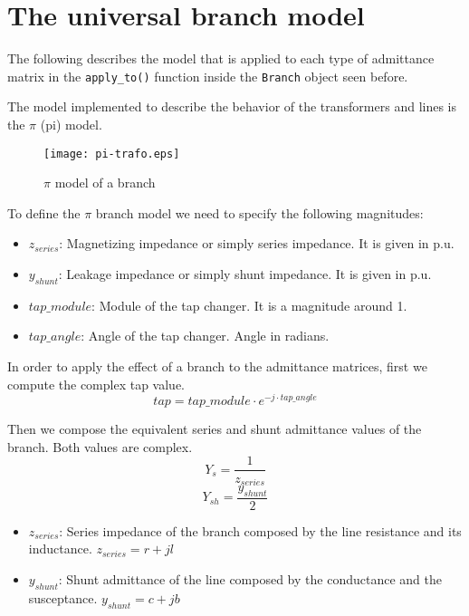 \documentclass[11pt,fleqn]{book} %
\begin{document}
\section{The universal branch model}\label{Universal_branch_model}

The following describes the model that is applied to each type of admittance matrix in the \verb|apply_to()| function inside the \verb|Branch| object seen before.

The model implemented to describe the behavior of the transformers and lines is the $\pi$ (pi) model.
\begin{figure}[h]
	\centering\texttt{[image: pi-trafo.eps]}
	\caption{$\pi$ model of a branch}
	\label{trafo pi model}
\end{figure}

To define the $\pi$ branch model we need to specify the following magnitudes:

\begin{itemize}
	\item $z_{series}$: Magnetizing impedance or simply series impedance. It is given in p.u.
	\item $y_{shunt}$: Leakage impedance or simply shunt impedance. It is given in p.u.
	\item $tap\_module$: Module of the tap changer. It is a magnitude around 1.
	\item $tap\_angle$: Angle of the tap changer. Angle in radians.\newline
\end{itemize}



In order to apply the effect of a branch to the admittance matrices, first we compute the complex tap value.
$$tap = tap\_module \cdot e^{-j \cdot tap\_angle}$$  

Then we compose the equivalent series and shunt admittance values of the branch. Both values are complex.
$$Y_s = \frac{1}{z_{series}}$$
$$Y_{sh} = \frac{y_{shunt}}{2}$$

\begin{itemize}
	\item $z_{series}$: Series impedance of the branch composed by the line resistance and its inductance. $z_{series}=r + jl$
	
	\item $y_{shunt}$: Shunt admittance of the line composed by the conductance and the susceptance. $y_{shunt}=c+jb$\newline
\end{itemize}
\end{document}
